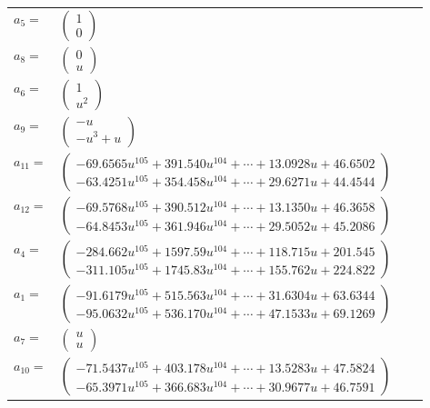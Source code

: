 \documentclass[1p]{elsarticle_modified}
\theoremstyle{definition}
\begin{document}
\begin{tabular}{m{7pt} m{180pt} m{7pt} m{180pt} }
\flushright $a_{5}=$&$\begin{pmatrix}1\\0\end{pmatrix}$ \\
\flushright $a_{8}=$&$\begin{pmatrix}0\\u\end{pmatrix}$ \\
\flushright $a_{6}=$&$\begin{pmatrix}1\\u^2\end{pmatrix}$ \\
\flushright $a_{9}=$&$\begin{pmatrix}- u\\- u^3+u\end{pmatrix}$ \\
\flushright $a_{11}=$&$\begin{pmatrix}-69.6565 u^{105}+391.540 u^{104}+\cdots+13.0928 u+46.6502\\-63.4251 u^{105}+354.458 u^{104}+\cdots+29.6271 u+44.4544\end{pmatrix}$ \\
\flushright $a_{12}=$&$\begin{pmatrix}-69.5768 u^{105}+390.512 u^{104}+\cdots+13.1350 u+46.3658\\-64.8453 u^{105}+361.946 u^{104}+\cdots+29.5052 u+45.2086\end{pmatrix}$ \\
\flushright $a_{4}=$&$\begin{pmatrix}-284.662 u^{105}+1597.59 u^{104}+\cdots+118.715 u+201.545\\-311.105 u^{105}+1745.83 u^{104}+\cdots+155.762 u+224.822\end{pmatrix}$ \\
\flushright $a_{1}=$&$\begin{pmatrix}-91.6179 u^{105}+515.563 u^{104}+\cdots+31.6304 u+63.6344\\-95.0632 u^{105}+536.170 u^{104}+\cdots+47.1533 u+69.1269\end{pmatrix}$ \\
\flushright $a_{7}=$&$\begin{pmatrix}u\\u\end{pmatrix}$ \\
\flushright $a_{10}=$&$\begin{pmatrix}-71.5437 u^{105}+403.178 u^{104}+\cdots+13.5283 u+47.5824\\-65.3971 u^{105}+366.683 u^{104}+\cdots+30.9677 u+46.7591\end{pmatrix}$ \\

\end{tabular}
\end{document}
